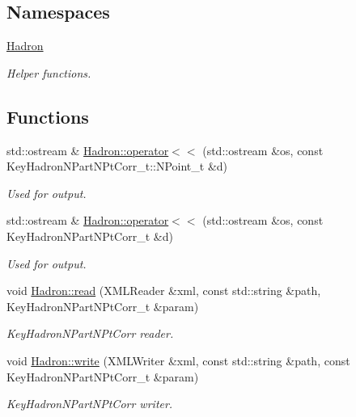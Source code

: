 \subsection*{Namespaces}
\begin{DoxyCompactItemize}
\item 
 \mbox{\hyperlink{namespaceHadron}{Hadron}}
\begin{DoxyCompactList}\small\item\em Helper functions. \end{DoxyCompactList}\end{DoxyCompactItemize}
\subsection*{Functions}
\begin{DoxyCompactItemize}
\item 
std\+::ostream \& \mbox{\hyperlink{namespaceHadron_aa96f2bb0448730889b5e59a58a1a62dd}{Hadron\+::operator$<$$<$}} (std\+::ostream \&os, const Key\+Hadron\+N\+Part\+N\+Pt\+Corr\+\_\+t\+::\+N\+Point\+\_\+t \&d)
\begin{DoxyCompactList}\small\item\em Used for output. \end{DoxyCompactList}\item 
std\+::ostream \& \mbox{\hyperlink{namespaceHadron_aa874bbfadc5859a87766ccbd07b10f48}{Hadron\+::operator$<$$<$}} (std\+::ostream \&os, const Key\+Hadron\+N\+Part\+N\+Pt\+Corr\+\_\+t \&d)
\begin{DoxyCompactList}\small\item\em Used for output. \end{DoxyCompactList}\item 
void \mbox{\hyperlink{namespaceHadron_a85b27e940a60880e6f98fb6a939d96c2}{Hadron\+::read}} (X\+M\+L\+Reader \&xml, const std\+::string \&path, Key\+Hadron\+N\+Part\+N\+Pt\+Corr\+\_\+t \&param)
\begin{DoxyCompactList}\small\item\em Key\+Hadron\+N\+Part\+N\+Pt\+Corr reader. \end{DoxyCompactList}\item 
void \mbox{\hyperlink{namespaceHadron_a295fddb7420012571f5b8115f2b25a97}{Hadron\+::write}} (X\+M\+L\+Writer \&xml, const std\+::string \&path, const Key\+Hadron\+N\+Part\+N\+Pt\+Corr\+\_\+t \&param)
\begin{DoxyCompactList}\small\item\em Key\+Hadron\+N\+Part\+N\+Pt\+Corr writer. \end{DoxyCompactList}\item 

\end{DoxyCompactItemize}
